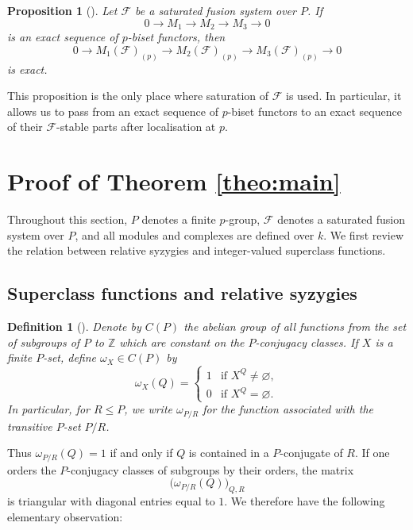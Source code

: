 \documentclass[preprint,12pt,3p]{elsarticle}
\newtheorem{definition}[theorem]{Definition}%
\newtheorem{proposition}[theorem]{Proposition}%
\def\F{\mathcal{F}}
\def\Z{\mathbb{Z}}
\begin{document}
\begin{proposition}[{\cite[Proposition 2.6]{RY18}}]\label{prop:stable-elements}
Let $\F$ be a saturated fusion system over $P$. If
$$
 0\longrightarrow M_1\longrightarrow M_2\longrightarrow M_3\longrightarrow 0
$$
is an exact sequence of $p$-biset functors, then
$$
 0\longrightarrow M_1(\F)_{(p)}\longrightarrow M_2(\F)_{(p)}\longrightarrow M_3(\F)_{(p)}\longrightarrow 0
$$
is exact.
\end{proposition}

This proposition is the only place where saturation of $\F$ is used. In particular, it allows us to pass from an exact sequence of $p$-biset functors to an exact sequence of their $\F$-stable parts after localisation at $p$.


\section{Proof of Theorem \ref{theo:main}}\label{s3}

Throughout this section, $P$ denotes a finite $p$-group, $\F$ denotes a saturated fusion system over $P$, and all modules and complexes are defined over $k$. We first review the relation between relative syzygies and integer-valued superclass functions.

\subsection{Superclass functions and relative syzygies}

\begin{definition}[{\cite[Section 6]{GY21}}]\label{def:superclass}
{\rm Denote by $C(P)$ the abelian group of all functions from the set of subgroups of $P$ to $\Z$ which are constant on the $P$-conjugacy classes.  If $X$ is a finite $P$-set, define $\omega_X\in C(P)$ by
$$
 \omega_X(Q)=
 \begin{cases}
  1 & \text{if }X^Q\neq\varnothing,\\
  0 & \text{if }X^Q=\varnothing.
 \end{cases}
$$
In particular, for $R\leq P$, we write $\omega_{P/R}$ for the function associated with the transitive $P$-set $P/R$.}
\end{definition}

Thus $\omega_{P/R}(Q)=1$ if and only if $Q$ is contained in a $P$-conjugate of $R$.  If one orders the $P$-conjugacy classes of subgroups by their orders, the matrix
$$
 \big(\omega_{P/R}(Q)\big)_{Q,R}
$$
is triangular with diagonal entries equal to $1$.  We therefore have the following elementary observation:\nopagebreak[4]
\end{document}
